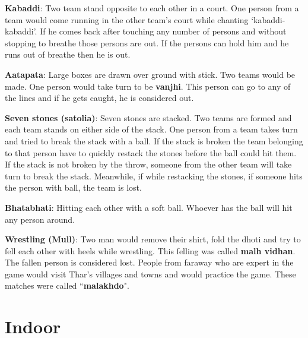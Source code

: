 \textbf{Kabaddi}: Two team stand opposite to each other in a court. One person
from a team would come running in the other team's court while chanting
`kabaddi-kabaddi'. If he comes back after touching any number of persons and
without stopping to breathe those persons are out. If the persons can hold him
and he runs out of breathe then he is out. 

\textbf{Aatapata}: Large boxes are drawn over ground with stick. Two teams
would be made. One person would take turn to be \textbf{vanjhi}. This person
can go to any of the lines and if he gets caught, he is considered out.

\textbf{Seven stones (satolia)}: Seven stones are stacked. Two teams are formed
and each team stands on either side of the stack. One person from a team takes
turn and tried to break the stack with a ball. If the stack is broken the team
belonging to that person have to quickly restack the stones before the ball
could hit them. If the stack is not broken by the throw, someone from the other
team will take turn to break the stack. Meanwhile, if while restacking the
stones, if someone hits the person with ball, the team is lost.

\textbf{Bhatabhati}: Hitting each other with a soft ball. Whoever has the ball
will hit any person around.

\textbf{Wrestling (Mull)}: Two man would remove their shirt, fold the dhoti and
try to fell each other with heels while wrestling. This felling was called
\textbf{malh vidhan}. The fallen person is considered lost. People from faraway
who are expert in the game would visit Thar's villages and towns and would
practice the game. These matches were called ``\textbf{malakhdo}".

\section{Indoor}

